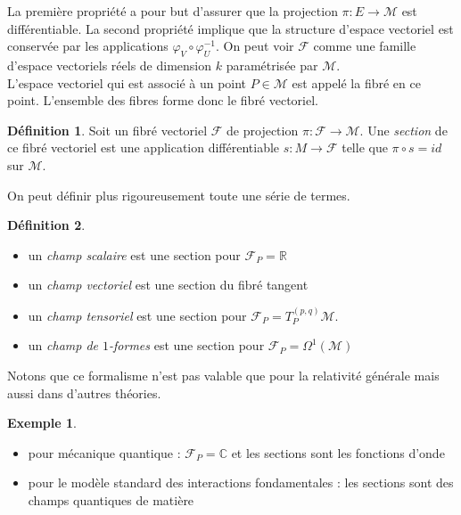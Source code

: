 \documentclass[a4paper,11pt]{report}
\theoremstyle{definition}
\theoremstyle{plain}
\theoremstyle{definition}
\newtheorem{defn}{Définition}[chapter]
\newtheorem{exmp}{Exemple}[chapter]
\theoremstyle{remark}
\newcommand{\M}{\mathscr{M}}
\newcommand{\F}{\mathcal{F}}
\begin{document}
                La première propriété a pour but d'assurer que la projection $\pi:E\to\M$ est différentiable. La second propriété implique que la structure d'espace vectoriel est conservée par les applications $\varphi_V\circ\varphi_U^{-1}$. On peut voir $\F$ comme une famille d'espace vectoriels réels de dimension $k$ paramétrisée par $\M$.\\
                
                L'espace vectoriel qui est associé à un point $P\in\M$ est appelé la fibré en ce point. L'ensemble des fibres forme donc le fibré vectoriel.
                
                \begin{defn}
                    Soit un fibré vectoriel $\F$ de projection $\pi:\F\to\M$. Une \textit{section} de ce fibré vectoriel est une application différentiable $s:M\to\F$ telle que $\pi\circ s = id$ sur $\M$.
                \end{defn}
                
                On peut définir plus rigoureusement toute une série de termes.
                \begin{defn}${}$
                    \begin{itemize}[label = \textbullet]
                        \item un \textit{champ scalaire} est une section pour $\F_P = \mathbb{R}$
                        \item un \textit{champ vectoriel} est une section du fibré tangent
                        \item un \textit{champ tensoriel} est une section pour $\F_P = T_P^{(p,q)}\M$.
                        \item un \textit{champ de $1$-formes} est une section pour $\F_P = \Omega^1(\M)$
                    \end{itemize}
                \end{defn}
                
                Notons que ce formalisme n'est pas valable que pour la relativité générale mais aussi dans d'autres théories.
                
                \begin{exmp}${}$
                    \begin{itemize}[label = \textbullet]
                        \item pour mécanique quantique : $\F_P = \mathbb{C}$ et les sections sont les fonctions d'onde
                        \item pour le modèle standard des interactions fondamentales : les sections sont des champs quantiques de matière
                    \end{itemize}
                \end{exmp}
                
\end{document}
